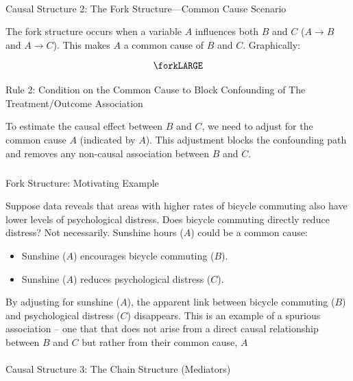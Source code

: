\documentclass[
  singlecolumn]{article}
\makeatletter
\let\oldparagraph\paragraph
\renewcommand{\paragraph}{
    \@ifstar
      \xxxParagraphStar
      \xxxParagraphNoStar
  }
\newcommand{\xxxParagraphStar}[1]{\oldparagraph*{#1}\mbox{}}
\newcommand{\xxxParagraphNoStar}[1]{\oldparagraph{#1}\mbox{}}
\let\oldsubparagraph\subparagraph
\renewcommand{\subparagraph}{
    \@ifstar
      \xxxSubParagraphStar
      \xxxSubParagraphNoStar
  }
\newcommand{\xxxSubParagraphStar}[1]{\oldsubparagraph*{#1}\mbox{}}
\newcommand{\xxxSubParagraphNoStar}[1]{\oldsubparagraph{#1}\mbox{}}
\providecommand{\tightlist}{%
  \setlength{\itemsep}{0pt}\setlength{\parskip}{0pt}}\usepackage{longtable,booktabs,array}
\makeatother
\begin{document}
\paragraph{Causal Structure 2: The Fork Structure---Common Cause
Scenario}\label{causal-structure-2-the-fork-structurecommon-cause-scenario}

The fork structure occurs when a variable \(A\) influences both \(B\)
and \(C\) (\(A \rightarrow B\) and \(A \rightarrow C\)). This makes
\(A\) a common cause of \(B\) and \(C\). Graphically:

\[
\forkLARGE
\]

\paragraph{Rule 2: Condition on the Common Cause to Block Confounding of
The Treatment/Outcome
Association}\label{rule-2-condition-on-the-common-cause-to-block-confounding-of-the-treatmentoutcome-association}

To estimate the causal effect between \(B\) and \(C\), we need to adjust
for the common cause \(A\) (indicated by \(\boxed{A}\)). This adjustment
blocks the confounding path and removes any non-causal association
between \(B\) and \(C\).

\subparagraph{Fork Structure: Motivating
Example}\label{fork-structure-motivating-example}

Suppose data reveals that areas with higher rates of bicycle commuting
also have lower levels of psychological distress. Does bicycle commuting
directly reduce distress? Not necessarily. Sunshine hours (\(A\)) could
be a common cause:

\begin{itemize}
\tightlist
\item
  Sunshine (\(A\)) encourages bicycle commuting (\(B\)).
\item
  Sunshine (\(A\)) reduces psychological distress (\(C\)).
\end{itemize}

By adjusting for sunshine (\(\boxed{A}\)), the apparent link between
bicycle commuting (\(B\)) and psychological distress (\(C\)) disappears.
This is an example of a spurious association -- one that that does not
arise from a direct causal relationship between \(B\) and \(C\) but
rather from their common cause, \(A\)

\paragraph{Causal Structure 3: The Chain Structure
(Mediators)}\label{causal-structure-3-the-chain-structure-mediators}
\end{document}
